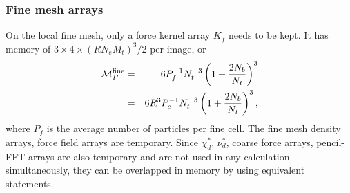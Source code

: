 \documentclass[10pt,twocolumn,preprint]{emulateapj}
\begin{document}
\subsubsection{Fine mesh arrays}
On the local fine mesh, only a force kernel array $K_f$ needs to be kept. It has memory of $3\times 4\times(RN_e M_t)^3/2$ per image, or
\begin{eqnarray}\label{eq.Mp_fine}
\nonumber	\mathcal{M}_P^{\rm fine}&=&6 P_f^{-1} N_t^{-3} \left ( 1+\frac{2N_b}{N_t} \right )^3 \\
					 &=& 6 R^3 P_c^{-1} N_t^{-3} \left ( 1+\frac{2N_b}{N_t} \right )^3,
\end{eqnarray}
where $P_f$ is the average number of particles per fine cell. The fine mesh density arrays, force field arrays are temporary. Since $\chi_d^*$, $\nu_d^*$, coarse force arrays, pencil-FFT arrays are also temporary and are not used in any calculation simultaneously, they can be overlapped in memory by using equivalent statements.
\end{document}
